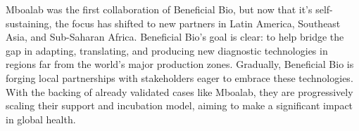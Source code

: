 \documentclass{article}
\begin{document}
\begin{multicols}{2}
Mboalab was the first collaboration of Beneficial Bio, but now that it's self-sustaining, the focus has shifted to new partners in Latin America, Southeast Asia, and Sub-Saharan 
Africa. Beneficial Bio's goal is clear: to help bridge the gap in adapting, translating, and producing new diagnostic technologies in regions far from the world's major production 
zones. Gradually, Beneficial Bio is forging local partnerships with stakeholders eager to embrace these technologies. With the backing of already validated cases like Mboalab, they 
are progressively scaling their support and incubation model, aiming to make a significant impact in global health.

\end{multicols}
\end{document}
